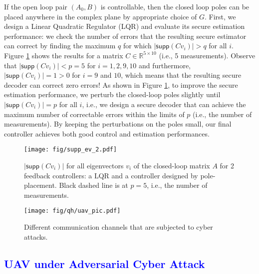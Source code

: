 \documentclass[12pt, conference, a4paper, twoside]{IEEEconf_mod}
\begin{document}
If the open loop pair $(A_0, B)$ is controllable, then the closed loop poles can be placed anywhere in the complex plane by appropriate choice of $G$. First, we design a Linear Quadratic Regulator (LQR) and evaluate its secure estimation performance: we check the number of errors that the resulting secure estimator can correct by finding the maximum $q$ for which $\lvert \textsf{supp} (C v_i) \rvert > q$ for all $i$. 
Figure \ref{fig:ex_pole} shows the results for a matrix $C \in \mathbb{R}^{5\times 10}$ (i.e., 5 measurements). Observe that $\lvert \textsf{supp} (C v_i) \rvert < p = 5$ for $i=1,2,9,10$ and furthermore, $\lvert \textsf{supp} (C v_i) \rvert = 1 > 0$ for $i = 9$ and $10$, which means that the resulting secure decoder can correct zero errors!
As shown in Figure \ref{fig:ex_pole}, to improve the secure estimation performance, we perturb the closed-loop poles slightly until $\lvert \textsf{supp} (C v_i) \rvert = p$ for all $i$, i.e., we design a secure decoder that can achieve the maximum number of correctable errors within the limits of $p$ (i.e., the number of measurements). By keeping the perturbations on the poles small, our final controller achieves both good control and estimation performances.%


\begin{figure}[t]
\center
\texttt{[image: fig/supp\_ev\_2.pdf]}
\caption{$ \lvert \textsf{supp} (C v_i) \rvert $ for all eigenvectors $v_i$ of the closed-loop matrix $A$ for 2 feedback controllers: a LQR and a controller designed by pole-placement. Black dashed line is at $p = 5$, i.e., the number of measurements.}
\label{fig:ex_pole}
\end{figure}


\begin{figure}
\center
\texttt{[image: fig/qh/uav\_pic.pdf]}
\caption{Different communication channels that are subjected to cyber attacks.}
\label{fig:ex_uav_pic}
\end{figure}




\subsection{\textcolor{blue}{UAV under Adversarial Cyber Attack}}
\end{document}
